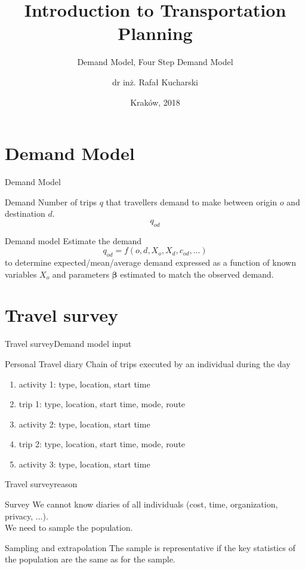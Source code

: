 \documentclass[8pt]{beamer}
\title[Kraków, 2018] %
{Introduction to Transportation Planning}
\subtitle
{Demand Model, Four Step Demand Model}
\author[dr in\.z. Rafa\l{} Kucharski] %
{dr in\.z. Rafa\l{} Kucharski\inst{1}}
\institute[] %
{
  \inst{1}%
  Katedra System\'{o}w Transportowych\\
  Politechnika Krakowska
 }
\date[KST, L-2, WIL, PK] %
{Krak\'{o}w, 2018}
\begin{document}
\begin{frame}
  \titlepage
\end{frame}

\section{Demand Model}
\begin{frame}{Demand Model}{}
	\begin{block}{Demand}
		Number of trips $q$ that travellers \alert{demand} to make between origin $o$ and destination $d$.
		\begin{equation}
		q_{od}
		\end{equation}
	\end{block}
	
	\begin{block}{Demand model}
		Estimate the demand
		\begin{equation}
		q_{od} = f(o,d,X_o,X_d,c_{od},\dots)
		\end{equation}
		to determine expected/mean/average demand expressed as a function of known variables $X_o$ and parameters $\bm{\beta}$ estimated to match the observed demand.
	\end{block}
\end{frame}

\section{Travel survey}
\begin{frame}{Travel survey}{Demand model input}
	\begin{block}{Personal Travel diary}
		Chain of trips executed by an individual during the day
	\end{block}
	
	\begin{enumerate}
	\item activity 1: type, location, start time
	\item trip 1: type, location, start time, mode, route
	\item activity 2: type, location, start time
	\item trip 2: type, location, start time, mode, route
	\item activity 3: type, location, start time
	\end{enumerate}
\end{frame}

\begin{frame}{Travel survey}{reason}
	\begin{block}{Survey}
		We cannot know diaries of all individuals (cost, time, organization, privacy, ...). \\ 
		We need to sample the population.	
	\end{block}
	
	\begin{block}{Sampling and extrapolation}
		The sample is representative if the key statistics of the population are the same as for the sample.	
	\end{block}	
\end{frame}
\end{document}
